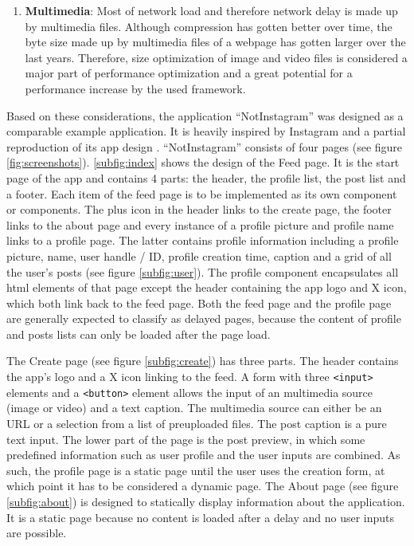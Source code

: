 \documentclass[a4paper, 10pt]{article}
\begin{document}
\begin{enumerate}
  \item \textbf{Multimedia}: Most of network load and therefore network delay is made up by multimedia files. %
  Although compression has gotten better over time, the byte size made up by multimedia files of a webpage has gotten larger over the last years. %
  Therefore, size optimization of image and video files is considered a major part of performance optimization and a great potential for a performance increase by the used framework.

\end{enumerate}

Based on these considerations, the application \enquote{NotInstagram} was designed as a comparable example application.
It is heavily inspired by Instagram and a partial reproduction of its app design \citep{instagram}.
\enquote{NotInstagram} consists of four pages (see figure \ref{fig:screenshots}).
\ref{subfig:index} shows the design of the Feed page.
It is the start page of the app and contains 4 parts: the header, the profile list, the post list and a footer.
Each item of the feed page is to be implemented as its own component or components.
The plus icon in the header links to the create page, the footer links to the about page and every instance of a profile picture and profile name links to a profile page.
The latter contains profile information including a profile picture, name, user handle / ID, profile creation time, caption and a grid of all the user's posts (see figure \ref{subfig:user}).
The profile component encapsulates all \acrshort{html} elements of that page except the header containing the app logo and X icon, which both link back to the feed page.
Both the feed page and the profile page are generally expected to classify as delayed pages, because the content of profile and posts lists can only be loaded after the page load.

The Create page (see figure \ref{subfig:create}) has three parts.
The header contains the app's logo and a X icon linking to the feed.
A form with three \verb|<input>| elements and a \verb|<button>| element allows the input of an multimedia source (image or video) and a text caption.
The multimedia source can either be an URL or a selection from a list of preuploaded files.
The post caption is a pure text input.
The lower part of the page is the post preview, in which some predefined information such as user profile and the user inputs are combined.
As such, the profile page is a static page until the user uses the creation form, at which point it has to be considered a dynamic page.
The About page (see figure \ref{subfig:about}) is designed to statically display information about the application.
It is a static page because no content is loaded after a delay and no user inputs are possible.
\end{document}

